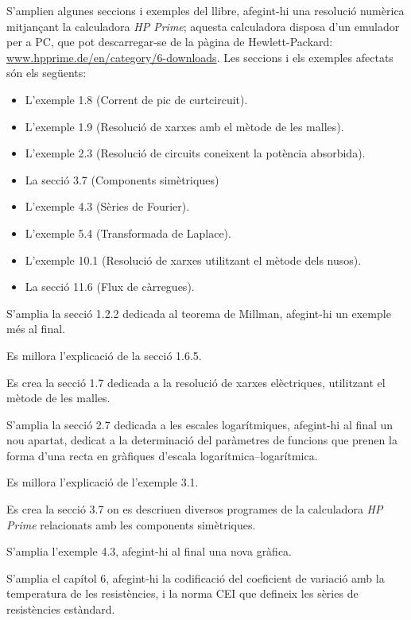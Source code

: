S'amplien algunes seccions i exemples del llibre, afegint-hi una  resolució numèrica mitjançant la calculadora \emph{HP Prime};  aquesta calculadora disposa d'un emulador per a PC, que pot descarregar-se de la pàgina de Hewlett-Packard: \href{http://www.hpprime.de/en/category/6-downloads}{www.hpprime.de/en/category/6-downloads}. Les seccions i els exemples afectats són els següents:
\begin{itemize}
  \item L'exemple 1.8  (Corrent de pic de curtcircuit).
  \item L'exemple 1.9 (Resolució de xarxes amb el mètode de les malles).
  \item L'exemple 2.3 (Resolució de circuits coneixent la potència absorbida).
  \item La secció 3.7 (Components simètriques)
  \item L'exemple 4.3 (Sèries de Fourier).
  \item L'exemple 5.4 (Transformada de Laplace).
  \item L'exemple 10.1 (Resolució de xarxes utilitzant el mètode dels nusos).
  \item La secció 11.6 (Flux de càrregues).
\end{itemize}

S'amplia la secció 1.2.2 dedicada al teorema de Millman, afegint-hi un exemple més al final.

Es millora l'explicació de la secció 1.6.5.

Es crea la secció 1.7 dedicada a la resolució de xarxes elèctriques, utilitzant el mètode de les malles.

S'amplia la secció 2.7 dedicada a les escales logarítmiques, afegint-hi al final un nou apartat, dedicat a la determinació del paràmetres de funcions que prenen la forma d'una recta en gràfiques d'escala logarítmica--logarítmica.

Es millora l'explicació de l'exemple 3.1.

Es crea la secció 3.7 on es descriuen diversos programes de la calculadora
\emph{HP Prime} relacionats amb les components simètriques.

S'amplia l'exemple 4.3, afegint-hi al final  una nova gràfica.

S'amplia el capítol 6, afegint-hi la codificació del coeficient de variació amb la temperatura de les resistències, i la norma CEI que defineix les sèries de resistències estàndard.

